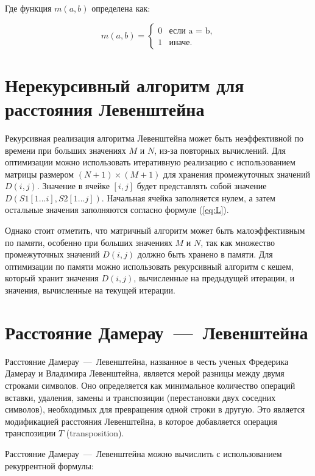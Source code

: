 Где функция $m(a, b)$ определена как:

\begin{equation}
	\label{eq:m}
	m(a, b) = \begin{cases}
		0 &\text{если a = b,}\\
		1 &\text{иначе.}
	\end{cases}
\end{equation}

\section{Нерекурсивный алгоритм для расстояния Левенштейна}

Рекурсивная реализация алгоритма Левенштейна может быть неэффективной по времени при больших значениях $M$ и $N$, из-за повторных вычислений. 
Для оптимизации можно использовать итеративную реализацию с использованием матрицы размером $(N + 1) \times (M + 1)$ для хранения промежуточных значений $D(i,j)$. 
Значение в ячейке $[i, j]$ будет представлять собой значение $D(S1[1...i], S2[1...j])$. 
Начальная ячейка заполняется нулем, а затем остальные значения заполняются согласно формуле (\ref{eq:L}).

Однако стоит отметить, что матричный алгоритм может быть малоэффективным по памяти, особенно при больших значениях $M$ и $N$, так как множество промежуточных значений $D(i,j)$ должно быть хранено в памяти. 
Для оптимизации по памяти можно использовать рекурсивный алгоритм с кешем, который хранит значения $D(i,j)$, вычисленные на предыдущей итерации, и значения, вычисленные на текущей итерации.

\section{Расстояние Дамерау~---~Левенштейна}

Расстояние Дамерау~---~Левенштейна, названное в честь ученых Фредерика Дамерау и Владимира Левенштейна, является мерой разницы между двумя строками символов. 
Оно определяется как минимальное количество операций вставки, удаления, замены и транспозиции (перестановки двух соседних символов), необходимых для превращения одной строки в другую. 
Это является модификацией расстояния Левенштейна, в которое добавляется операция транспозиции $T$ (transposition).

Расстояние Дамерау~---~Левенштейна можно вычислить с использованием рекуррентной формулы:

